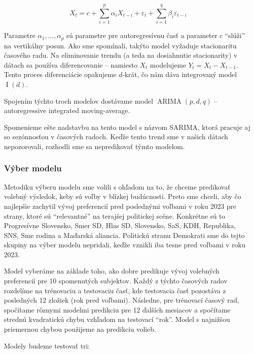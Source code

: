 \documentclass[report.tex]{subfiles}
\begin{document}
\begin{equation*}
	X_t = c + \sum_{i=1}^{p}\alpha_i X_{t-i} + \varepsilon_t + \sum_{i=1}^{q}\beta_i\varepsilon_{t-i}
\end{equation*}

Parametre $\alpha_1,\dots,\alpha_p$ sú parametre pre autoregresívnu časť a parameter $c$ \enquote{slúži} na vertikálny posun. Ako sme spomínali, takýto model vyžaduje stacionaritu časového radu. Na eliminovanie trendu (a teda na dosiahnutie stacionarity) v dátach sa používa diferencovanie -- namiesto $X_t$ modelujeme $Y_t = X_t - X_{t-1}$. Tento proces diferenciácie opakujeme $d$-krát, čo nám dáva integrovaný model $\operatorname{I}(d)$. 

Spojením týchto troch modelov dostávame model $\operatorname{ARIMA}(p,d,q)$ -- autoregressive integrated moving-average.

Spomenieme ešte nadstavbu na tento model s názvom SARIMA, ktorá pracuje aj so sezónnosťou v časových radoch. Keďže tento trend sme v našich dátach nepozorovali, rozhodli sme sa nepredikovať týmto modelom. 

\subsubsection{Výber modelu}

Metodiku výberu modelu sme volili s ohľadom na to, že chceme predikovať volebný výsledok, keby sú voľby v blízkej budúcnosti. Preto sme chceli, aby čo najlepšie zachytil vývoj preferencií pred poslednými voľbami v roku 2023 pre strany, ktoré sú \enquote{relevantné} na terajšej politickej scéne. Konkrétne sú to Progresívne Slovensko, Smer SD, Hlas SD, Slovensko, SaS, KDH, Republika, SNS, Sme rodina a Maďarská aliancia. Politickú stranu Demokrati sme do tejto skupiny na výber modelu nepridali, keďže vznikli iba tesne pred voľbami v roku 2023. 

Model vyberáme na základe toho, ako dobre predikuje vývoj volebných preferencií pre 10 spomenutých subjektov. Každý z týchto časových radov rozdelíme na trénovaciu a testovaciu časť, kde testovacia časť pozostáva z posledných 12 zložiek (rok pred voľbami). Následne, pre trénovací časový rad, spočítame rôznymi modelmi predikciu pre 12 ďalších mesiacov a spočítame strednú kvadratickú chybu vzhľadom na testovací \enquote{rok}. Model s najnižšou priemernou chybou použijeme na predikciu volieb. 

\newpage

Modely budeme testovať tri:
\end{document}
